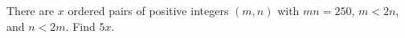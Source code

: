 There are $ x $ ordered pairs of positive integers $(m,n)$ with $ mn=250 $, $ m<2n $, and $ n<2m $. Find $ 5x $.
